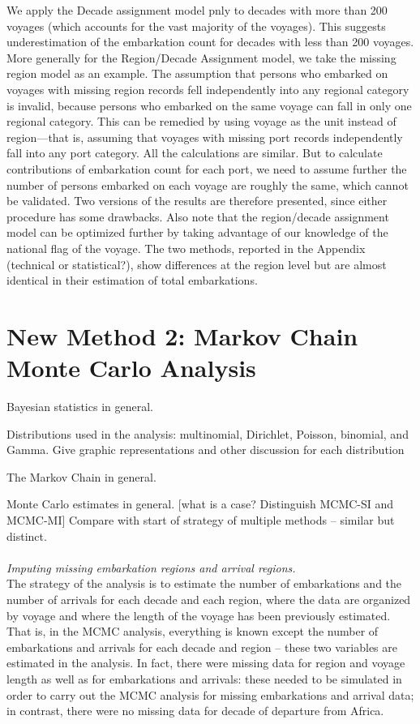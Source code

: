 \documentclass{article}
\begin{document}
We apply the Decade assignment model pnly to decades with more than 200 voyages (which accounts for the vast majority of the voyages). This suggests underestimation of the embarkation count for decades with less than 200 voyages. More generally for the Region/Decade Assignment model, we take the missing region model as an example. The assumption that persons who embarked on voyages with missing region records fell independently into any regional category is invalid, because persons who embarked on the same voyage can fall in only one regional category. This can be remedied by using voyage as the unit instead of region---that is, assuming that voyages with missing port records independently fall into any port category. All the calculations are similar. But to calculate contributions of embarkation count for each port, we need to assume further the number of persons embarked on each voyage are roughly the same, which cannot be validated. Two versions of the results are therefore presented, since either procedure has some drawbacks. Also note that the region/decade assignment model can be optimized further by taking advantage of our knowledge of the national flag of the voyage. The two methods, reported in the Appendix (technical or statistical?), show differences at the region level but are almost identical in their estimation of total embarkations.\\


\section{New Method 2: Markov Chain Monte Carlo Analysis}

Bayesian statistics in general.

Distributions used in the analysis:
multinomial, Dirichlet, Poisson, binomial, and Gamma. Give graphic representations and other discussion for each distribution

The Markov Chain in general.

Monte Carlo estimates in general.
[what is a case? Distinguish MCMC-SI and MCMC-MI] Compare with start of strategy of multiple methods -- similar but distinct.\\
\\
\noindent
\textit{Imputing missing embarkation regions and arrival regions.}\\
\indent
The strategy of the analysis is to estimate the number of embarkations and the number of arrivals for each decade and each region, where the data are organized by voyage and where the length of the voyage has been previously estimated. That is, in the MCMC analysis, everything is known except the number of embarkations and arrivals for each decade and region -- these two variables are estimated in the analysis. In fact, there were missing data for region and voyage length as well as for embarkations and arrivals: these needed to be simulated in order to carry out the MCMC analysis for missing embarkations and arrival data; in contrast, there were no missing data for decade of departure from Africa.\\
\end{document}
